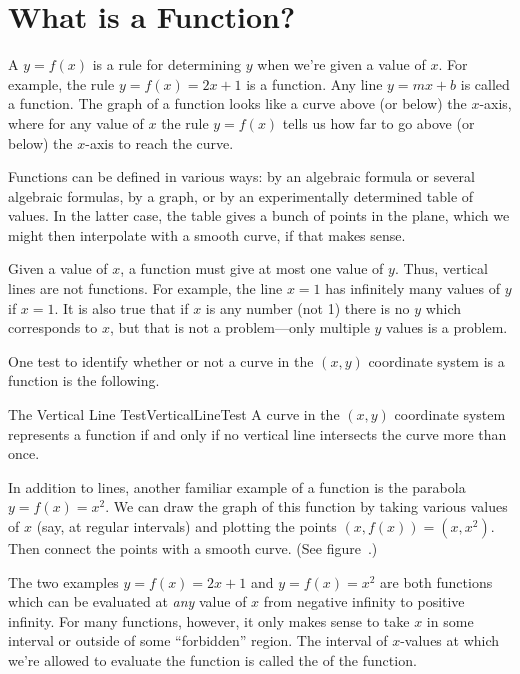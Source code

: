 \section{What is a Function?}\label{sec:Functions}
A  $y=f(x)$ is a rule for determining
$y$ when we're given a value of $x$.  For example, the rule
$y=f(x)=2x+1$ is a function.  Any line $y=mx+b$ is called a  
function.  The graph of a function looks like a curve 
above (or below) the $x$-axis, where for any value
of $x$ the rule $y=f(x)$ tells us how far to go above (or below) the
$x$-axis to reach the curve.

Functions can be defined in various ways: by an algebraic formula or several
algebraic formulas, by a graph, or by an experimentally determined 
table of values. In the latter case, the table gives a bunch of 
points in the plane, which we might then
interpolate with a smooth curve, if that makes sense.

Given a value of $x$, a function must give
at most one value of $y$.  Thus, vertical lines are not functions.  For
example, the line $x=1$ has infinitely many values of $y$ if $x=1$. It
is also true that 
if $x$ is any number (not 1) there is no $y$ which corresponds to $x$,
but that is not a problem---only multiple $y$ values is a problem.

One test to identify whether or not a curve in the $(x,y)$ coordinate 
system is a function is the following.

\begin{theorem}{The Vertical Line Test}{VerticalLineTest}
A curve in the $(x,y)$ coordinate system represents a function if and only if no vertical line intersects the curve more than once.
\end{theorem}

In addition to lines, another familiar example of a  
function is the parabola $y=f(x)=x^2$.  We can draw the graph of this
function by taking various values of $x$ (say, at regular intervals) and
plotting the points $(x,f(x))=(x,x^2)$.  Then connect the points with a
smooth curve.  (See figure~.)
 
The two examples $y=f(x)=2x+1$ and $y=f(x)=x^2$ are both functions which
can be evaluated at {\it any} value of $x$ from negative infinity to
positive infinity.  For many functions, however, it only makes sense to
take $x$ in some interval or outside of some ``forbidden'' region.  The
interval of $x$-values at which we're allowed to evaluate the function is
called the  of the function.

